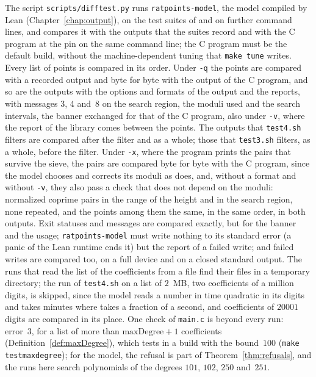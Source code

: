 The script \verb|scripts/difftest.py| runs \verb|ratpoints-model|, the model compiled by Lean
(Chapter~\ref{chap:output}), on the test suites of \ratpoints{} and on further command lines, and
compares it with the outputs that the suites record and with the C program at the pin on the same
command line; the C program must be the default build, without the machine-dependent tuning that
\verb|make tune| writes. Every list of points is compared in its order. Under \verb|-q| the points
are compared with a recorded output and byte for byte with the output of the C program, and so are
the outputs with the options and formats of the output and the reports, with messages 3, 4 and~8 on
the search region, the moduli used and the search intervals, the banner exchanged for that of the C
program, also under \verb|-v|, where the report of the library comes between the points. The
outputs that \verb|test4.sh| filters are compared after the filter and as a whole; those that
\verb|test3.sh| filters, as a whole, before the filter. Under \verb|-x|, where the program prints
the pairs that survive the sieve, the pairs are compared byte for byte with the C program, since the
model chooses and corrects its moduli as \ratpoints{} does, and, without a format and without
\verb|-v|, they also pass a check that does not depend on the moduli: normalized coprime pairs in
the range of the height and in the search region, none repeated, and the points among them the
same, in the same order, in both outputs. Exit statuses and messages are compared exactly, but for
the banner and the usage; \verb|ratpoints-model| must write nothing to its standard error (a panic
of the Lean runtime ends it) but the report of a failed write; and failed writes are compared too,
on a full device and on a closed standard output. The runs that read the list of the coefficients
from a file find their files in a temporary directory; the run of \verb|test4.sh| on a list of
$2$~MB, two coefficients of a million digits, is skipped, since the model reads a number in time
quadratic in its digits and takes minutes where \ratpoints{} takes a fraction of a second, and
coefficients of $20001$ digits are compared in its place. One check of \verb|main.c| is beyond every
run: error~3, for a list of more than $\mathrm{maxDegree} + 1$ coefficients
(Definition~\ref{def:maxDegree}), which \ratpoints{} tests in a build with the bound~$100$
(\verb|make testmaxdegree|); for the model, the refusal is part of Theorem~\ref{thm:refusals}, and
the runs here search polynomials of the degrees $101$, $102$, $250$ and~$251$.

